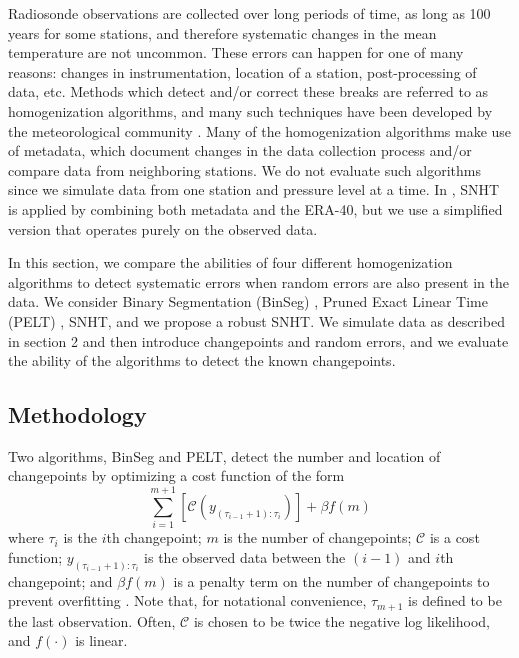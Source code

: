 \documentclass[12pt]{article}
\begin{document}
\begin{doublespacing}
Radiosonde observations are collected over long periods of time, as long as 100 years for some stations, and therefore systematic changes in the mean temperature are not uncommon.  These errors can happen for one of many reasons: changes in instrumentation, location of a station, post-processing of data, etc.  Methods which detect and/or correct these breaks are referred to as homogenization algorithms, and many such techniques have been developed by the meteorological community \cite{alexandersson86, domonkos13, gruber08, haimberger07, lanzante03, li14, lu10, venema12}.  Many of the homogenization algorithms make use of metadata, which document changes in the data collection process and/or compare data from neighboring stations.  We do not evaluate such algorithms since we simulate data from one station and pressure level at a time.  In \cite{haimberger07}, SNHT is applied by combining both metadata and the ERA-40, but we use a simplified version that operates purely on the observed data.

In this section, we compare the abilities of four different homogenization algorithms to detect systematic errors when random errors are also present in the data.  We consider Binary Segmentation (BinSeg) \cite{scott74}, Pruned Exact Linear Time (PELT) \cite{killick12}, SNHT, and we propose a robust SNHT.  We simulate data as described in section 2 and then introduce changepoints and random errors, and we evaluate the ability of the algorithms to detect the known changepoints. 

\subsection{Methodology}
\label{ssec:methodology}

Two algorithms, BinSeg and PELT, detect the number and location of changepoints by optimizing a cost function of the form
\begin{equation}
	\sum_{i=1}^{m+1} [\mathcal{C}(y_{(\tau_{i-1}+1):\tau_i})] + \beta f(m)
	\label{eq:cost}
\end{equation}
where $\tau_i$ is the $i$th changepoint; $m$ is the number of changepoints; $\mathcal{C}$ is a cost function; $y_{(\tau_{i-1}+1):\tau_i}$ is the observed data between the $(i-1)$ and $i$th changepoint; and $\beta f(m)$ is a penalty term on the number of changepoints to prevent overfitting \cite{killick12}.  Note that, for notational convenience, $\tau_{m+1}$ is defined to be the last observation.  Often, $\mathcal{C}$ is chosen to be twice the negative log likelihood, and $f(\cdot)$ is linear.


\end{doublespacing}
\end{document}
